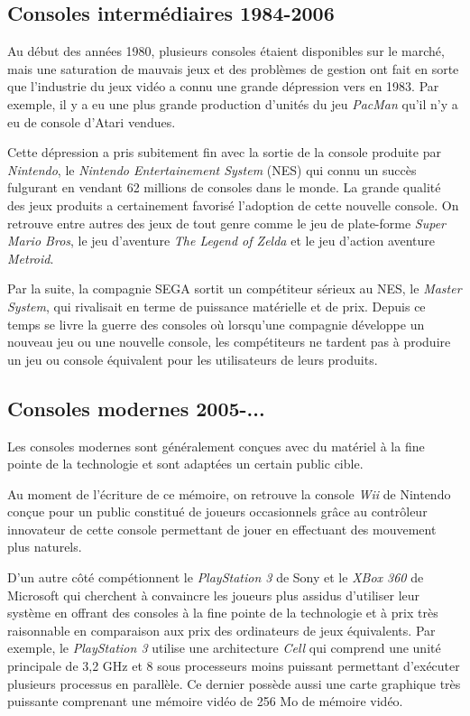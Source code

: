 \documentclass[12pt,twoside,letterpaper,francais]{book}
\begin{document}
\FloatBarrier
\subsection{Consoles intermédiaires 1984-2006}
Au début des années 1980, plusieurs consoles étaient disponibles sur
le marché, mais une saturation de mauvais jeux et des problèmes de
gestion ont fait en sorte que l'industrie du jeux vidéo a connu une
grande dépression vers en 1983. Par exemple, il y a eu une plus grande
production d'unités du jeu \textit{PacMan} qu'il n'y a eu de console
d'Atari vendues.

Cette dépression a pris subitement fin avec la sortie de la console
produite par \textit{Nintendo}, le \textit{Nintendo Entertainement
  System} (NES) qui connu un succès fulgurant en vendant 62 millions
de consoles dans le monde. La grande qualité des jeux produits a
certainement favorisé l'adoption de cette nouvelle console. On
retrouve entre autres des jeux de tout genre comme le jeu de
plate-forme \textit{Super Mario Bros}, le jeu d'aventure \textit{The
  Legend of Zelda} et le jeu d'action aventure \textit{Metroid}.

Par la suite, la compagnie SEGA sortit un compétiteur sérieux au NES,
le \textit{Master System}, qui rivalisait en terme de puissance
matérielle et de prix. Depuis ce temps se livre la guerre des consoles
où lorsqu'une compagnie développe un nouveau jeu ou une nouvelle
console, les compétiteurs ne tardent pas à produire un jeu ou console
équivalent pour les utilisateurs de leurs produits.


\FloatBarrier
\subsection{Consoles modernes 2005-...}
Les consoles modernes sont généralement conçues avec du matériel à la
fine pointe de la technologie et sont adaptées un certain public
cible.

Au moment de l'écriture de ce mémoire, on retrouve la console
\textit{Wii} de Nintendo conçue pour un public constitué de joueurs
occasionnels grâce au contrôleur innovateur de cette console
permettant de jouer en effectuant des mouvement plus naturels.

D'un autre côté compétionnent le \textit{PlayStation 3} de Sony et le
\textit{XBox 360} de Microsoft qui cherchent à convaincre les joueurs
plus assidus d'utiliser leur système en offrant des consoles à la fine
pointe de la technologie et à prix très raisonnable en comparaison aux
prix des ordinateurs de jeux équivalents. Par exemple, le
\textit{PlayStation 3} utilise une architecture \textit{Cell} qui
comprend une unité principale de 3,2 GHz et 8 sous processeurs moins
puissant permettant d'exécuter plusieurs processus en parallèle. Ce
dernier possède aussi une carte graphique très puissante comprenant
une mémoire vidéo de 256 Mo de mémoire vidéo. 
\end{document}
